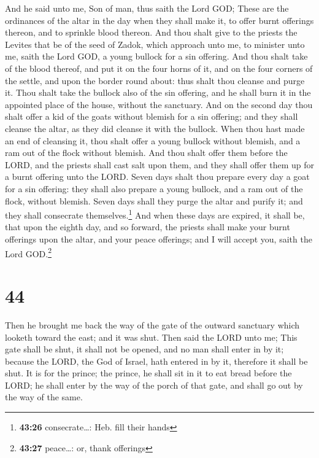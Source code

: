  And he said unto me, Son of man, thus saith the Lord
GOD; These are the ordinances of the altar in the day when they shall
make it, to offer burnt offerings thereon, and to sprinkle blood
thereon.  And thou shalt give to the priests the Levites
that be of the seed of Zadok, which approach unto me, to minister unto
me, saith the Lord GOD, a young bullock for a sin offering.
 And thou shalt take of the blood thereof, and put it on
the four horns of it, and on the four corners of the settle, and upon
the border round about: thus shalt thou cleanse and purge it.
 Thou shalt take the bullock also of the sin offering,
and he shall burn it in the appointed place of the house, without the
sanctuary.  And on the second day thou shalt offer a kid
of the goats without blemish for a sin offering; and they shall cleanse
the altar, as they did cleanse it with the bullock.  When
thou hast made an end of cleansing it, thou shalt offer a young bullock
without blemish, and a ram out of the flock without blemish.
 And thou shalt offer them before the LORD, and the
priests shall cast salt upon them, and they shall offer them up for a
burnt offering unto the LORD.  Seven days shalt thou
prepare every day a goat for a sin offering: they shall also prepare a
young bullock, and a ram out of the flock, without blemish.
 Seven days shall they purge the altar and purify it; and
they shall consecrate themselves.\footnote{\textbf{43:26}
  consecrate\ldots: Heb. fill their hands}  And when
these days are expired, it shall be, that upon the eighth day, and so
forward, the priests shall make your burnt offerings upon the altar, and
your peace offerings; and I will accept you, saith the Lord
GOD.\footnote{\textbf{43:27} peace\ldots: or, thank offerings}

\hypertarget{section-43}{%
\section{44}\label{section-43}}

 Then he brought me back the way of the gate of the
outward sanctuary which looketh toward the east; and it was shut.
 Then said the LORD unto me; This gate shall be shut, it
shall not be opened, and no man shall enter in by it; because the LORD,
the God of Israel, hath entered in by it, therefore it shall be shut.
 It is for the prince; the prince, he shall sit in it to
eat bread before the LORD; he shall enter by the way of the porch of
that gate, and shall go out by the way of the same.

